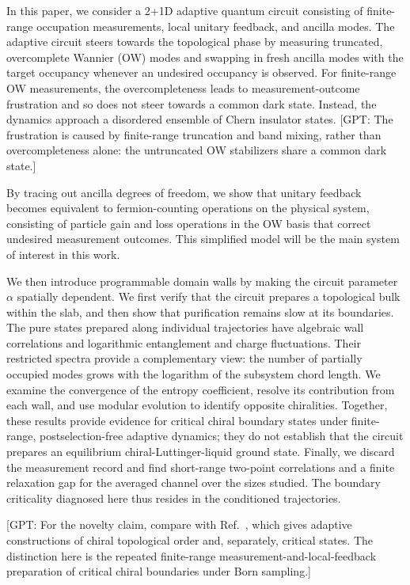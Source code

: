 \documentclass[aps,prb,10pt,twocolumn,superscriptaddress,longbibliography,floatfix]{revtex4-2}
\newcommand{\GPT}[1]{{\color{magenta}[GPT: #1]}}
\begin{document}
In this paper, we consider a 2+1D adaptive quantum circuit consisting of finite-range occupation measurements, local unitary feedback, and ancilla modes. The adaptive circuit steers towards the topological phase by measuring truncated, overcomplete Wannier (OW) modes and swapping in fresh ancilla modes with the target occupancy whenever an undesired occupancy is observed. For finite-range OW measurements, the overcompleteness leads to measurement-outcome frustration and so does not steer towards a common dark state. Instead, the dynamics approach a disordered ensemble of Chern insulator states.
\GPT{The frustration is caused by finite-range truncation and band mixing, rather than overcompleteness alone: the untruncated OW stabilizers share a common dark state.}
 
By tracing out ancilla degrees of freedom, we show that unitary feedback becomes equivalent to fermion-counting operations on the physical system, consisting of particle gain and loss operations in the OW basis that correct undesired measurement outcomes. This simplified model will be the main system of interest in this work.

{\color{blue}
We then introduce programmable domain walls by making the circuit parameter $\alpha$ spatially dependent. We first verify that the circuit prepares a topological bulk within the slab, and then show that purification remains slow at its boundaries. The pure states prepared along individual trajectories have algebraic wall correlations and logarithmic entanglement and charge fluctuations. Their restricted spectra provide a complementary view: the number of partially occupied modes grows with the logarithm of the subsystem chord length. We examine the convergence of the entropy coefficient, resolve its contribution from each wall, and use modular evolution to identify opposite chiralities. Together, these results provide evidence for critical chiral boundary states under finite-range, postselection-free adaptive dynamics; they do not establish that the circuit prepares an equilibrium chiral-Luttinger-liquid ground state. Finally, we discard the measurement record and find short-range two-point correlations and a finite relaxation gap for the averaged channel over the sizes studied. The boundary criticality diagnosed here thus resides in the conditioned trajectories.
}



\GPT{For the novelty claim, compare with Ref.~\cite{LuLessaKimHsieh2022}, which gives adaptive constructions of chiral topological order and, separately, critical states. The distinction here is the repeated finite-range measurement-and-local-feedback preparation of critical chiral boundaries under Born sampling.}
\end{document}
